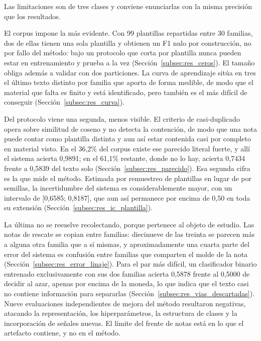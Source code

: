 Las limitaciones son de tres clases y conviene enunciarlas con la misma precisión que los resultados.

El corpus impone la más evidente. Con 99 plantillas repartidas entre 30 familias, dos de ellas tienen una sola plantilla y obtienen un F1 nulo por construcción, no por fallo del método: bajo un protocolo que corta por plantilla nunca pueden estar en entrenamiento y prueba a la vez (Sección~\ref{subsec:res_ceros}). El tamaño obliga además a validar con dos particiones. La curva de aprendizaje sitúa en tres el último texto distinto por familia que aporta de forma medible, de modo que el material que falta es finito y está identificado, pero también es el más difícil de conseguir (Sección~\ref{subsec:res_curva}).

Del protocolo viene una segunda, menos visible. El criterio de casi-duplicado opera sobre similitud de coseno y no detecta la contención, de modo que una nota puede contar como plantilla distinta y aun así estar contenida casi por completo en material visto. En el 36,2\% del corpus existe ese parecido literal fuerte, y allí el sistema acierta 0,9891; en el 61,1\% restante, donde no lo hay, acierta 0,7434 frente a 0,5839 del texto solo (Sección~\ref{subsec:res_parecido}). Esa segunda cifra es la que mide el método. Estimada por remuestreo de plantillas en lugar de por semillas, la incertidumbre del sistema es considerablemente mayor, con un intervalo de [0,6585; 0,8187], que aun así permanece por encima de 0,50 en toda su extensión (Sección~\ref{subsec:res_ic_plantilla}).

La última no se resuelve recolectando, porque pertenece al objeto de estudio. Las notas de rescate se copian entre familias: diecinueve de las treinta se parecen más a alguna otra familia que a sí mismas, y aproximadamente una cuarta parte del error del sistema es confusión entre familias que comparten el molde de la nota (Sección~\ref{subsec:res_error_linaje}). Para el par más difícil, un clasificador binario entrenado exclusivamente con sus dos familias acierta 0,5878 frente al 0,5000 de decidir al azar, apenas por encima de la moneda, lo que indica que el texto casi no contiene información para separarlas (Sección~\ref{subsec:res_vias_descartadas}). Nueve evaluaciones independientes de mejora del método resultaron negativas, atacando la representación, los hiperparámetros, la estructura de clases y la incorporación de señales nuevas. El límite del frente de notas está en lo que el artefacto contiene, y no en el método.

